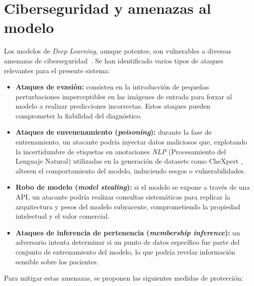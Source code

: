 \section{Ciberseguridad y amenazas al modelo}
Los modelos de \textit{Deep Learning}, aunque potentes, son vulnerables a diversas amenazas de ciberseguridad~\cite{finlaysonAdversarialAttacks2019, dongSurveyAdversarial2024}. Se han identificado varios tipos de ataques relevantes para el presente sistema:
\begin{itemize}
    \item \textbf{Ataques de evasión:} consisten en la introducción de pequeñas perturbaciones imperceptibles en las imágenes de entrada para forzar al modelo a realizar predicciones incorrectas. Estos ataques pueden comprometer la fiabilidad del diagnóstico.
    \item \textbf{Ataques de envenenamiento (\textit{poisoning}):} durante la fase de entrenamiento, un atacante podría inyectar datos maliciosos que, explotando la incertidumbre de etiquetas en anotaciones \textit{NLP} (Procesamiento del Lenguaje Natural) utilizadas en la generación de datasets como CheXpert \cite{irvinCheXpertLargeChest2019}, alteren el comportamiento del modelo, induciendo sesgos o vulnerabilidades.
    \item \textbf{Robo de modelo (\textit{model stealing}):} si el modelo se expone a través de una API, un atacante podría realizar consultas sistemáticas para replicar la arquitectura y pesos del modelo subyacente, comprometiendo la propiedad intelectual y el valor comercial.
    \item \textbf{Ataques de inferencia de pertenencia (\textit{membership inference}):} un adversario intenta determinar si un punto de datos específico fue parte del conjunto de entrenamiento del modelo, lo que podría revelar información sensible sobre los pacientes.
\end{itemize}
Para mitigar estas amenazas, se proponen las siguientes medidas de protección:
